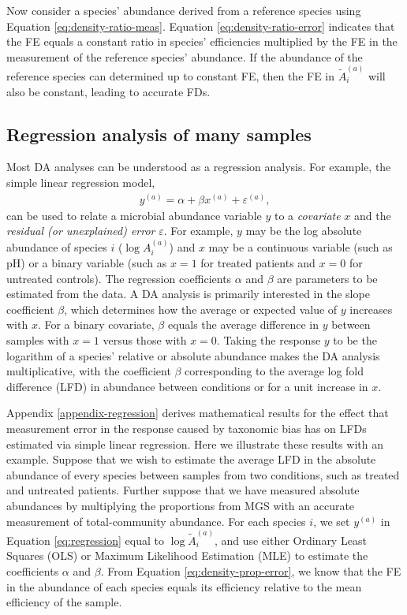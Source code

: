 \documentclass[
]{article}
\begin{document}
Now consider a species' abundance derived from a reference species using Equation \eqref{eq:density-ratio-meas}.
Equation \eqref{eq:density-ratio-error} indicates that the FE equals a constant ratio in species' efficiencies multiplied by the FE in the measurement of the reference species' abundance.
If the abundance of the reference species can determined up to constant FE, then the FE in \(\tilde A_i^{(a)}\) will also be constant, leading to accurate FDs.

\hypertarget{regression-analysis-of-many-samples}{%
\subsection{Regression analysis of many samples}\label{regression-analysis-of-many-samples}}

Most DA analyses can be understood as a regression analysis.
For example, the simple linear regression model,
\begin{align}
  \label{eq:regression}
  y^{(a)} = \alpha + \beta x^{(a)} + \varepsilon^{(a)},
\end{align}
can be used to relate a microbial abundance variable \(y\) to a \emph{covariate} \(x\) and the \emph{residual (or unexplained) error} \(\varepsilon\).
For example, \(y\) may be the log absolute abundance of species \(i\) (\(\log A_i^{(a)}\)) and \(x\) may be a continuous variable (such as pH) or a binary variable (such as \(x=1\) for treated patients and \(x=0\) for untreated controls).
The regression coefficients \(\alpha\) and \(\beta\) are parameters to be estimated from the data.
A DA analysis is primarily interested in the slope coefficient \(\beta\), which determines how the average or expected value of \(y\) increases with \(x\).
For a binary covariate, \(\beta\) equals the average difference in \(y\) between samples with \(x=1\) versus those with \(x=0\).
Taking the response \(y\) to be the logarithm of a species' relative or absolute abundance makes the DA analysis multiplicative, with the coefficient \(\beta\) corresponding to the average log fold difference (LFD) in abundance between conditions or for a unit increase in \(x\).

Appendix \ref{appendix-regression} derives mathematical results for the effect that measurement error in the response caused by taxonomic bias has on LFDs estimated via simple linear regression.
Here we illustrate these results with an example.
Suppose that we wish to estimate the average LFD in the absolute abundance of every species between samples from two conditions, such as treated and untreated patients.
Further suppose that we have measured absolute abundances by multiplying the proportions from MGS with an accurate measurement of total-community abundance.
For each species \(i\), we set \(y^{(a)}\) in Equation \eqref{eq:regression} equal to \(\log \tilde A_{i}^{(a)}\), and use either Ordinary Least Squares (OLS) or Maximum Likelihood Estimation (MLE) to estimate the coefficients \(\alpha\) and \(\beta\).
From Equation \eqref{eq:density-prop-error}, we know that the FE in the abundance of each species equals its efficiency relative to the mean efficiency of the sample.
\end{document}
